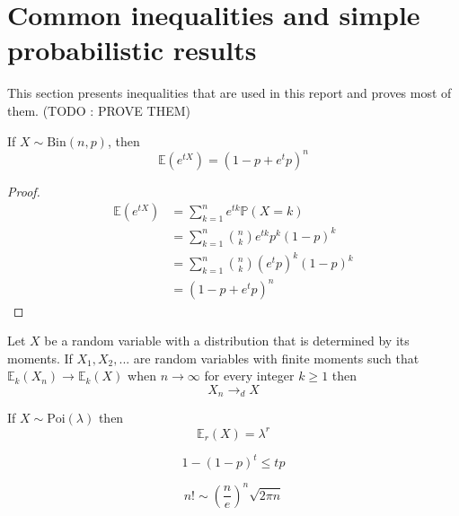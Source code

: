\section{Common inequalities and simple probabilistic results}
This section presents inequalities that are used in this report and proves most of them. (TODO : PROVE THEM)
\begin{theorem}\label{binMGF}
	If $X \sim \text{Bin}(n, p)$, then 
	\begin{equation}
		\mathbb{E}(e^{tX}) = (1 - p + e^t p)^n
	\end{equation}
\end{theorem}
\begin{proof}
	\begin{align}
		\mathbb{E}(e^{tX}) 	&= \sum_{k=1}^n e^{tk} \mathbb{P}(X =k) \\
					&= \sum_{k=1}^n \binom{n}{k} e^{tk}p^k(1-p)^k  \\
					&= \sum_{k=1}^n \binom{n}{k} (e^tp)^k(1-p)^k  \\
					&=(1 - p + e^t p)^n
	\end{align}
\end{proof}
\begin{theorem}
	Let $X$ be a random variable with a distribution that is determined by its moments. If $X_1, X_2, ...$ are random variables with finite moments such that
	$\mathbb{E}_k(X_n) \longrightarrow \mathbb{E}_k(X)$ when $ n \to \infty$ for every integer $k \geq 1$ then
	\begin{equation}
		X_n \longrightarrow_d X
	\end{equation}
\end{theorem}
\begin{theorem}\label{th:factPois}
	If $X \sim \text{Poi}(\lambda)$ then
	\begin{equation}
		\mathbb{E}_r(X) = \lambda^r
	\end{equation}
\end{theorem}
\begin{theorem}\label{bernoulli}
	\begin{equation}
		1 - (1-p)^t \leq tp
	\end{equation}
\end{theorem}
\begin{theorem}\label{stirling}
	\begin{equation}
		n! \sim (\frac{n}{e})^n \sqrt{2\pi n}
	\end{equation}
\end{theorem}

